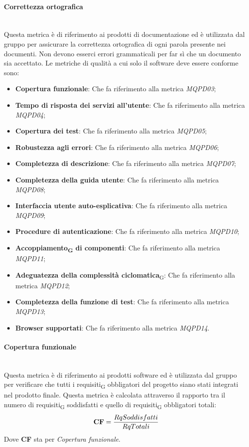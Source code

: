 \paragraph{Correttezza ortografica}\mbox{}\\
Questa metrica è di riferimento ai prodotti di documentazione ed è utilizzata dal gruppo per assicurare la correttezza ortografica di ogni parola presente nei documenti. Non devono esserci errori grammaticali per far sì che un documento sia accettato.
Le metriche di qualità a cui solo il software deve essere conforme sono:
\begin{itemize}
	\item \textbf{Copertura funzionale}: Che fa riferimento alla metrica \textit{MQPD03};
	\item \textbf{Tempo di risposta dei servizi all'utente}: Che fa riferimento alla metrica \textit{MQPD04};
	\item \textbf{Copertura dei test}: Che fa riferimento alla metrica \textit{MQPD05};
	\item \textbf{Robustezza agli errori}: Che fa riferimento alla metrica \textit{MQPD06};
	\item \textbf{Completezza di descrizione}: Che fa riferimento alla metrica \textit{MQPD07};
	\item \textbf{Completezza della guida utente}: Che fa riferimento alla metrica \textit{MQPD08};
	\item \textbf{Interfaccia utente auto-esplicativa}: Che fa riferimento alla metrica \textit{MQPD09};
	\item \textbf{Procedure di autenticazione}: Che fa riferimento alla metrica \textit{MQPD10};
	\item \textbf{Accoppiamento\textsubscript{G} di componenti}: Che fa riferimento alla metrica \textit{MQPD11};
	\item \textbf{Adeguatezza della complessità ciclomatica}\textsubscript{G}: Che fa riferimento alla metrica \textit{MQPD12};
	\item \textbf{Completezza della funzione di test}: Che fa riferimento alla metrica \textit{MQPD13};
	\item \textbf{Browser supportati}: Che fa riferimento alla metrica \textit{MQPD14}.
\end{itemize}
\paragraph{Copertura funzionale}\mbox{}\\
Questa metrica è di riferimento ai prodotti software ed è utilizzata dal gruppo per verificare che tutti i requisiti\textsubscript{G} obbligatori del progetto siano stati integrati nel prodotto finale. Questa metrica è calcolata attraverso il rapporto tra il numero di requisiti\textsubscript{G} soddisfatti e quello di requisiti\textsubscript{G} obbligatori totali:
\begin{align*}
	\centering
	\textbf{CF} = \frac{RqSoddisfatti}{RqTotali}
\end{align*}
Dove \textbf{CF} sta per \textit{Copertura funzionale}.
